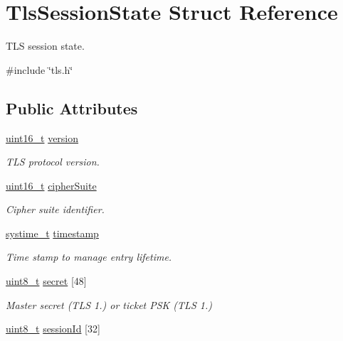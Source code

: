 \hypertarget{structTlsSessionState}{}\section{Tls\+Session\+State Struct Reference}
\label{structTlsSessionState}


T\+LS session state.  




{\ttfamily \#include \char`\"{}tls.\+h\char`\"{}}

\subsection*{Public Attributes}
\begin{DoxyCompactItemize}
\item 
\hyperlink{stdint_8h_a273cf69d639a59973b6019625df33e30}{uint16\+\_\+t} \hyperlink{structTlsSessionState_a174320f3867df007a4315bfa7a84e42c}{version}
\begin{DoxyCompactList}\small\item\em T\+LS protocol version. \end{DoxyCompactList}\item 
\hyperlink{stdint_8h_a273cf69d639a59973b6019625df33e30}{uint16\+\_\+t} \hyperlink{structTlsSessionState_a645a198fee226b387ad71fa2df860bd2}{cipher\+Suite}
\begin{DoxyCompactList}\small\item\em Cipher suite identifier. \end{DoxyCompactList}\item 
\hyperlink{compiler__port_8h_ae3e32a98d431a02106616da3071832dd}{systime\+\_\+t} \hyperlink{structTlsSessionState_a6923caefbda8f5283ff9920459485f0b}{timestamp}
\begin{DoxyCompactList}\small\item\em Time stamp to manage entry lifetime. \end{DoxyCompactList}\item 
\hyperlink{stdint_8h_aba7bc1797add20fe3efdf37ced1182c5}{uint8\+\_\+t} \hyperlink{structTlsSessionState_af48b2d61b9483b6f1bb698c719c5bd3f}{secret} \mbox{[}48\mbox{]}
\begin{DoxyCompactList}\small\item\em Master secret (T\+LS 1.) or ticket P\+SK (T\+LS 1.) \end{DoxyCompactList}\item 
\hyperlink{stdint_8h_aba7bc1797add20fe3efdf37ced1182c5}{uint8\+\_\+t} \hyperlink{structTlsSessionState_a784cd9c073b07b51f1cf315e9fb19768}{session\+Id} \mbox{[}32\mbox{]}

\end{DoxyCompactItemize}
